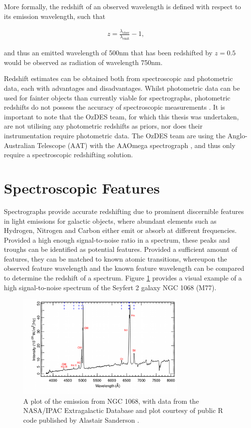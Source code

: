 \documentclass[titlesmallcaps, examinerscopy, copyrightpage]{uqthesis}
\begin{document}
More formally, the redshift of an observed wavelength is defined with respect to its emission wavelength, such that

\begin{align}
z = \frac{\lambda_{\text{obsv}}}{\lambda_{\text{emit}}} - 1,
\end{align}

and thus an emitted wavelength of 500nm that has been redshifted by $z = 0.5$ would be observed as radiation of wavelength 750nm.

Redshift estimates can be obtained both from spectroscopic and photometric data, each with advantages and disadvantages. Whilst photometric data can be used for fainter objects than currently viable for spectrographs, photometric redshifts do not possess the accuracy of spectroscopic measurements \cite{bolzonella2000photometric}. It is important to note that the OzDES team, for which this thesis was undertaken, are not utilising any photometric redshifts as priors, nor does their instrumentation require photometric data. The OzDES team are using the Anglo-Australian Telescope (AAT) with the AAOmega spectrograph \cite{d2014ozdes}, and thus only require a spectroscopic redshifting solution.

\section{Spectroscopic Features}

Spectrographs provide accurate redshifting due to prominent discernible features in light emissions for galactic objects, where abundant elements such as Hydrogen, Nitrogen and Carbon either emit or absorb at different frequencies. Provided a high enough signal-to-noise ratio in a spectrum, these peaks and troughs can be identified as potential features. Provided a sufficient amount of features, they can be matched to known atomic transitions, whereupon the observed feature wavelength and the known feature wavelength can be compared to determine the redshift of a spectrum. Figure \ref{fig:emission} provides a visual example of a high signal-to-noise spectrum of the Seyfert 2 galaxy NGC 1068 (M77).

\begin{figure}[ht!]
\includegraphics[width=0.75\textwidth]{images/M77_opt_spectrum.png} 
\centering
\caption{A plot of the emission from NGC 1068, with data from the NASA/IPAC Extragalactic Database\cite{nasaDB} and plot courtesy of public R code published by Alastair Sanderson \cite{emission}.}
\label{fig:emission}
\end{figure}
\end{document}
